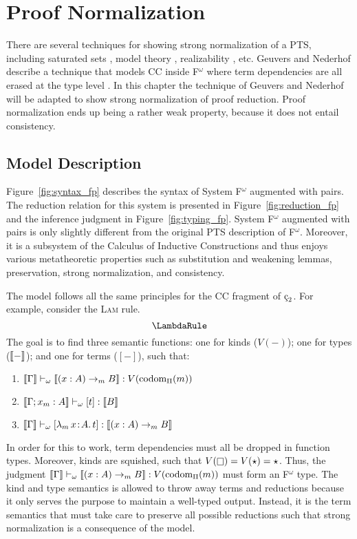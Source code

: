 \chapter{Proof Normalization}
\label{chap:3}


There are several techniques for showing strong normalization of a PTS, including saturated sets \cite{geuvers1994_sn_satset}, model theory \cite{terlouw1995_sn}, realizability \cite{ong1993}, etc.
Geuvers and Nederhof describe a technique that models CC inside F$^\omega$ where term dependencies are all erased at the type level \cite{geuvers1991_sn_tof}.
In this chapter the technique of Geuvers and Nederhof will be adapted to show strong normalization of proof reduction.
Proof normalization ends up being a rather weak property, because it does not entail consistency.

\section{Model Description}

Figure~\ref{fig:syntax_fp} describes the syntax of System F$^\omega$ augmented with pairs.
The reduction relation for this system is presented in Figure~\ref{fig:reduction_fp} and the inference judgment in Figure~\ref{fig:typing_fp}.
System F$^\omega$ augmented with pairs is only slightly different from the original PTS description of F$^\omega$.
Moreover, it is a subsystem of the Calculus of Inductive Constructions and thus enjoys various metatheoretic properties such as substitution and weakening lemmas, preservation, strong normalization, and consistency.





The model follows all the same principles for the CC fragment of $\ced$.
For example, consider the \textsc{Lam} rule.
$$\LambdaRule$$
The goal is to find three semantic functions: one for kinds ($V(-)$); one for types ($\llbracket - \rrbracket$); and one for terms ($[-]$), such that:
    \begin{enumerate}
        \item $\llbracket \Gamma \rrbracket \vdash_\omega \llbracket (x : A) \to_m B \rrbracket : V(\textnormal{codom}_\Pi(m))$
        \item $\llbracket \Gamma; x_m : A \rrbracket \vdash_\omega [t] : \llbracket B \rrbracket$
        \item $\llbracket \Gamma \rrbracket \vdash_\omega [{\lambda_m}\, x\! : \! A.\, t] : \llbracket (x : A) \to_m B \rrbracket$
    \end{enumerate}
In order for this to work, term dependencies must all be dropped in function types.
Moreover, kinds are squished, such that $V(\kind) = V(\star) = \star$.
Thus, the judgment $\llbracket \Gamma \rrbracket \vdash_\omega \llbracket (x : A) \to_m B \rrbracket : V(\textnormal{codom}_\Pi(m))$ must form an F$^\omega$ type.
The kind and type semantics is allowed to throw away terms and reductions because it only serves the purpose to maintain a well-typed output.
Instead, it is the term semantics that must take care to preserve all possible reductions such that strong normalization is a consequence of the model.

